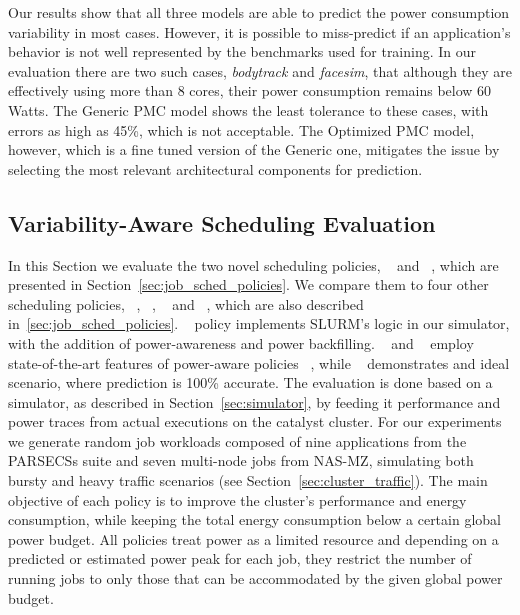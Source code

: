 Our results show that all three models are able to predict the power consumption variability in most cases.  However, it is possible to
miss-predict if an application's behavior is not well represented by the benchmarks used for training.  
In our evaluation there are two
such cases, \textit{bodytrack} and \textit{facesim}, that although they are effectively using more than 8 cores, their power consumption remains below 60 Watts.  
The Generic PMC model
 shows the least tolerance to these cases, with errors as high as 45\%, which is not acceptable.  
The Optimized PMC model, however,
which is a fine tuned version of the Generic one, mitigates the issue by selecting the most relevant architectural components for prediction. 

\subsection{Variability-Aware Scheduling Evaluation}
\label{sec:job_sched_eval}
In this Section we evaluate the two novel scheduling policies, \PRVSSched~ and \PMCVSSched~, which are presented in Section~\ref{sec:job_sched_policies}.
We compare them to four other scheduling policies, \DefaultSched~, \PESched~, \PEVASched~ and \IVSSched~, which are also described in~\ref{sec:job_sched_policies}.
\DefaultSched~ policy implements SLURM's logic in our simulator, with the addition of power-awareness and power backfilling.
\PESched~ and \PEVASched~ employ state-of-the-art features of power-aware policies ~\cite{patki:2013:eho:2464996.2465009,7515666,Gholkar:2016:PTH:2967938.2967961},
while \IVSSched~ demonstrates and ideal scenario, where prediction is 100\% accurate.  
The evaluation is done based on a simulator, as described in Section~\ref{sec:simulator}, by feeding it performance and power traces from actual executions on the catalyst cluster.
For our experiments we generate random job workloads composed of nine applications from the PARSECSs suite and seven multi-node jobs from NAS-MZ, simulating both bursty and heavy traffic scenarios
(see Section~\ref{sec:cluster_traffic}).
The main objective of each policy is to improve the cluster's performance and energy consumption, while keeping the total energy consumption below a certain global power budget. 
All policies treat power as a limited resource 
and depending on a predicted or estimated power peak for each job, they restrict the number of running jobs to only those that can be accommodated by the given global power budget.  

